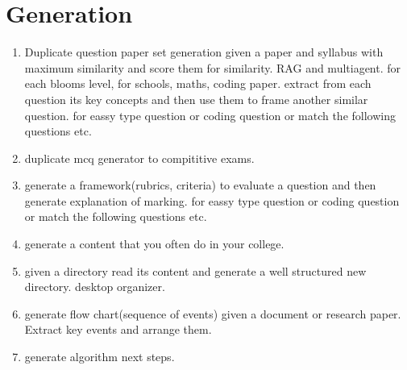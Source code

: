 \section{Generation}
    \begin{enumerate}
        \item Duplicate question paper set generation given a paper and syllabus with maximum similarity and score them for similarity. RAG and multiagent. for each blooms level, for schools, maths, coding paper. extract from each question its key concepts and then use them to frame another similar question. for eassy type question or coding question or match the following questions etc.

        \item duplicate mcq generator to compititive exams.

        \item generate a framework(rubrics, criteria) to evaluate a question and then generate explanation of marking. for eassy type question or coding question or match the following questions etc.

        \item generate a content that you often do in your college.

        \item given a directory read its content and generate a well structured new directory. desktop organizer.

        \item generate flow chart(sequence of events) given a document or research paper. Extract key events and arrange them.

        \item generate algorithm next steps.

    \end{enumerate}
